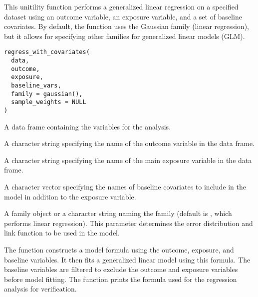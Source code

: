 \documentclass[a4paper]{book}
\begin{document}
%
\begin{Description}
This unitility function performs a generalized linear regression on a specified dataset using an outcome variable, an exposure variable, and a set of baseline covariates. By default, the function uses the Gaussian family (linear regression), but it allows for specifying other families for generalized linear models (GLM).
\end{Description}
%
\begin{Usage}
\begin{verbatim}
regress_with_covariates(
  data,
  outcome,
  exposure,
  baseline_vars,
  family = gaussian(),
  sample_weights = NULL
)
\end{verbatim}
\end{Usage}
%
\begin{Arguments}
\begin{ldescription}
\item[\code{data}] A data frame containing the variables for the analysis.

\item[\code{outcome}] A character string specifying the name of the outcome variable in the data frame.

\item[\code{exposure}] A character string specifying the name of the main exposure variable in the data frame.

\item[\code{baseline\_vars}] A character vector specifying the names of baseline covariates to include in the model in addition to the exposure variable.

\item[\code{family}] A family object or a character string naming the family (default is , which performs linear regression). This parameter determines the error distribution and link function to be used in the model.
\end{ldescription}
\end{Arguments}
%
\begin{Details}
The function constructs a model formula using the outcome, exposure, and baseline variables. It then fits a generalized linear model using this formula. The baseline variables are filtered to exclude the outcome and exposure variables before model fitting. The function prints the formula used for the regression analysis for verification.
\end{Details}
\end{document}
